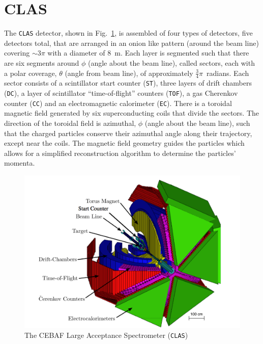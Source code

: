 \documentclass{aip-cp}
\begin{document}
\section{CLAS}
The \textsc{\texttt{CLAS}} detector, shown in Fig.~\ref{fig:clas}, is assembled of four types of detectors, five detectors total,  that are arranged in an onion like pattern (around the beam line) covering $\sim 3\pi$ with a diameter of 8~m. Each layer is segmented such that there are six segments around $\phi$ (angle about the beam line), called sectors, each with a polar coverage, $\theta$ (angle from beam line), of approximately $\frac{3}{4}\pi$~radians. Each sector consists of a scintillator start counter (\textsc{\texttt{ST}}), three layers of drift chambers (\textsc{\texttt{DC}}), a layer of scintillator ``time-of-flight'' counters (\textsc{\texttt{TOF}}), a gas Cherenkov counter (\textsc{\texttt{CC}}) and an electromagnetic calorimeter (\textsc{\texttt{EC}}). There is a toroidal magnetic field generated by six superconducting coils that divide the sectors. The direction of the toroidal field is azimuthal, $\phi$ (angle about the beam line), such that the charged particles conserve their azimuthal angle along their trajectory, except near the coils. The magnetic field geometry guides the particles which allows for a simplified reconstruction algorithm to determine the particles' momenta.
\begin{figure}[h]
	\centerline{\includegraphics[width=175 pt]{figures/clas_schematicIII.pdf}}
	\caption{The CEBAF Large Acceptance Spectrometer (\textsc{\texttt{CLAS}}) }
	\label{fig:clas}
\end{figure}
\end{document}
